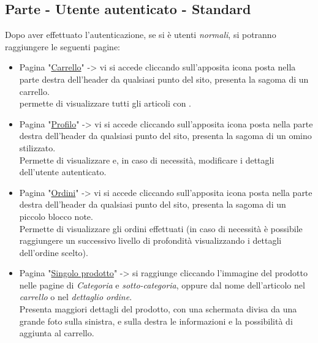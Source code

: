 \subsection{Parte - Utente autenticato - Standard}
Dopo aver effettuato l'autenticazione, se si è utenti \textit{normali}, si potranno raggiungere le seguenti pagine:

\begin{itemize}
	\item Pagina "\underline{Carrello}" -> vi si accede cliccando sull’apposita icona posta nella parte destra dell'header da qualsiasi punto del sito, presenta la sagoma di un carrello.\\
	permette di visualizzare tutti gli articoli con .
	\item Pagina "\underline{Profilo}" ->  vi si accede cliccando sull’apposita icona posta nella parte destra dell'header da qualsiasi punto del sito, presenta la sagoma di un omino stilizzato.\\ Permette di visualizzare e, in caso di necessità, modificare i dettagli dell’utente autenticato.
	\item Pagina "\underline{Ordini}" ->  vi si accede cliccando sull’apposita icona posta nella parte destra dell'header da qualsiasi punto del sito, presenta la sagoma di un piccolo blocco note.\\ Permette di visualizzare gli ordini effettuati (in caso di necessità è possibile raggiungere un successivo livello di profondità visualizzando i dettagli dell'ordine scelto).
	\item Pagina "\underline{Singolo prodotto}" -> si raggiunge cliccando l'immagine del prodotto nelle pagine di \textit{Categoria} e \textit{sotto-categoria}, oppure dal nome dell'articolo nel \textit{carrello} o nel \textit{dettaglio ordine}.\\
	Presenta maggiori dettagli del prodotto, con una schermata divisa da una grande foto sulla sinistra, e sulla destra le informazioni e la possibilità di aggiunta al carrello.
\end{itemize}

